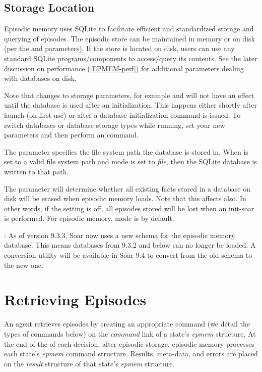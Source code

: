 \subsection{Storage Location}
Episodic memory uses SQLite to facilitate efficient and standardized storage and querying of episodes.  
The episodic store can be maintained in memory or on disk (per the  and  parameters).  
If the store is located on disk, users can use any standard SQLite programs/components to access/query its contents. 
See the later discussion on performance (\ref{EPMEM-perf}) for additional parameters dealing with databases on disk.

Note that changes to storage parameters, for example  and  will not have an effect until the database is used after an initialization. This happens either shortly after launch (on first use) or after a database initialization command is issued. To switch databases or database storage types while running, set your new parameters and then perform an  command.

The  parameter specifies the file system path the database is stored in. When  is set to a valid file system path and  mode is set to \emph{file}, then the SQLite database is written to that path.

The  parameter will determine whether all existing facts stored in a database on disk will be erased when episodic memory loads. Note that this affects  also.  In other words, if the  setting is off, all episodes stored will be lost when an init-soar is performed. For episodic memory,  mode is  by default.

: As of version 9.3.3, Soar now uses a new schema for the episodic memory database. This means databases from 9.3.2 and below can no longer be loaded.  A conversion utility will be available in Soar 9.4 to convert from the old schema to the new one.

\section{Retrieving Episodes}
\label{EPMEM-retrieval}

An agent retrieves episodes by creating an appropriate command (we detail the types of commands below) on the \emph{command} link of a state's \emph{epmem} structure. 
At the end of the  of each decision, after episodic storage, episodic memory processes each state's \emph{epmem} command structure.  
Results, meta-data, and errors are placed on the \emph{result} structure of that state's \emph{epmem} structure.

